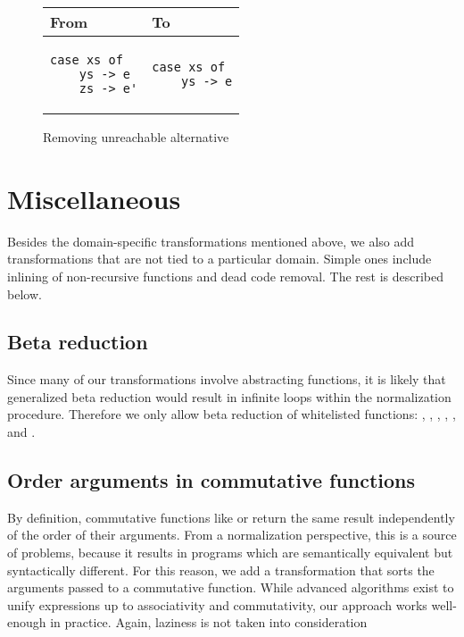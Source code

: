 \begin{figure}
\centering
\begin{tabular}{>{\centering\arraybackslash}m{8em} | >{\centering\arraybackslash}m{8em} }
From & To \\
\hline
\begin{verbatim}
case xs of
    ys -> e
    zs -> e'
\end{verbatim}
& \begin{verbatim}
case xs of
    ys -> e
\end{verbatim}
\end{tabular}
\caption{Removing unreachable alternative}
\label{fig:patterns-remove-unreachable-alt}
\end{figure}

\section{Miscellaneous}

Besides the domain-specific transformations mentioned above, we also add transformations that are not tied to a particular domain. Simple ones include inlining of non-recursive functions and dead code removal. The rest is described below.

\subsection{Beta reduction}

Since many of our transformations involve abstracting functions, it is likely that generalized beta reduction would result in infinite loops within the normalization procedure. Therefore we only allow beta reduction of whitelisted functions: , , \haskell{++}, , ,  and .

\subsection{Order arguments in commutative functions}

By definition, commutative functions like \haskell{(+)} or \haskell{(*)} return the same result independently of the order of their arguments. From a normalization perspective, this is a source of problems, because it results in programs which are semantically equivalent but syntactically different. For this reason, we add a transformation that sorts the arguments passed to a commutative function. While advanced algorithms exist to unify expressions up to associativity and commutativity, our approach works well-enough in practice. Again, laziness is not taken into consideration


